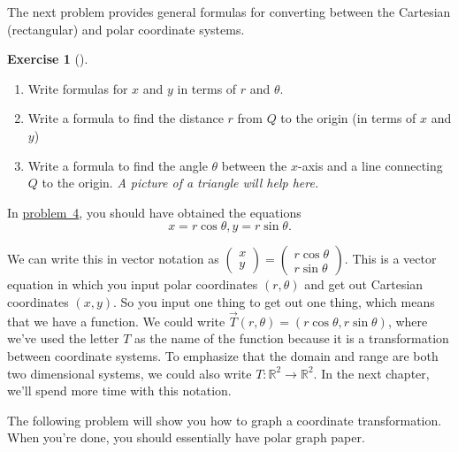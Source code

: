\documentclass[10pt,]{book}
\theoremstyle{plain}
\theoremstyle{definition}
\theoremstyle{definition}
\theoremstyle{definition}
\theoremstyle{definition}
\newtheorem{exploration}[project]{Exercise}
\theoremstyle{definition}
\numberwithin{equation}{section}
\begin{document}
The next problem provides general formulas for converting between the Cartesian (rectangular) and polar coordinate systems.%
\begin{exploration}[]\label{prob_polar_coordinate_equations}
\leavevmode%
\begin{enumerate}[font=\bfseries,label=(\alph*),ref=\alph*]
\item\label{task-140} Write formulas for \(x\) and \(y\) in terms of \(r\) and \(\theta\).%
\item\label{task-141} Write a formula to find the distance \(r\) from \(Q\) to the origin (in terms of \(x\) and \(y\))%
\item\label{task-142} Write a formula to find the angle \(\theta\) between the \(x\)-axis and a line connecting \(Q\) to the origin. \emph{A picture of a triangle will help here.%
}%
\end{enumerate}
\end{exploration}
In \hyperref[prob_polar_coordinate_equations]{problem~4}, you should have obtained the equations%
\begin{equation*}
x=r\cos\theta,  y=r\sin\theta.
\end{equation*}
%
\par
We can write this in vector notation as \(\begin{pmatrix}x\\y
\end{pmatrix} =\begin{pmatrix}r\cos\theta\\ r\sin\theta
\end{pmatrix}\). This is a vector equation in which you input polar coordinates \((r,\theta)\) and get out Cartesian coordinates \((x,y)\). So you input one thing to get out one thing, which means that we have a function. We could write \(\vec T(r,\theta) = (r\cos\theta,r\sin\theta)\), where we've used the letter \(T\) as the name of the function because it is a transformation between coordinate systems. To emphasize that the domain and range are both two dimensional systems, we could also write \(T:\mathbb{R}^2\to\mathbb{R}^2\). In the next chapter, we'll spend more time with this notation.%
\par
The following problem will show you how to graph a coordinate transformation. When you're done, you should essentially have polar graph paper.%
\end{document}
